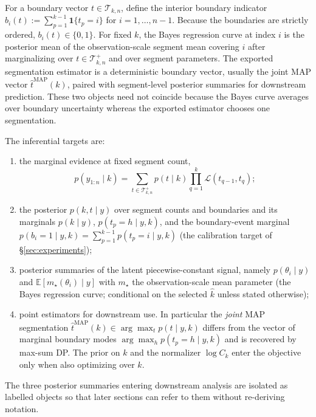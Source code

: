 \begin{definition}
\label{def:problem-bayes-curve}
For a boundary vector $t\in\mathcal{T}_{k,n}$, define the interior boundary indicator
$b_i(t):=\sum_{p=1}^{k-1}\mathbf{1}\{t_p=i\}$ for $i=1,\dots,n-1$. Because the boundaries are
strictly ordered, $b_i(t)\in\{0,1\}$. For fixed $k$, the Bayes regression curve at index $i$ is
the posterior mean of the observation-scale segment mean covering $i$ after marginalizing over
$t\in\mathcal{T}^{+}_{k,n}$ and over segment parameters. The exported segmentation estimator is a
deterministic boundary vector, usually the joint MAP vector $\widehat t^{\mathrm{MAP}}(k)$, paired
with segment-level posterior summaries for downstream prediction. These two objects need not
coincide because the Bayes curve averages over boundary uncertainty whereas the exported estimator
chooses one segmentation.
\end{definition}

The inferential targets are:
\begin{enumerate}[label=(\roman*), leftmargin=2.3em]
    \item the marginal evidence at fixed segment count,
    \[
      p(y_{1:n}\mid k)
      =\sum_{t\in\mathcal{T}^{+}_{k,n}}p(t\mid k)
        \prod_{q=1}^{k}\mathcal{L}(t_{q-1},t_q);
    \]
    \item the posterior $p(k,t\mid y)$ over segment counts and boundaries and its marginals
    $p(k\mid y)$, $p(t_p=h\mid y,k)$, and the boundary-event marginal
    \(p(b_i=1\mid y,k)=\sum_{p=1}^{k-1}p(t_p=i\mid y,k)\)
    (the calibration target of \S\ref{sec:experiments});
    \item posterior summaries of the latent piecewise-constant signal, namely
    $p(\theta_i\mid y)$ and $\mathbb{E}[m_\star(\theta_i)\mid y]$ with $m_\star$ the
    observation-scale mean parameter (the Bayes regression curve; conditional on the selected
    $\widehat k$ unless stated otherwise);
    \item point estimators for downstream use. In particular the \emph{joint} MAP segmentation
    \(\widehat t^{\mathrm{MAP}}(k)\in\arg\max_t p(t\mid y,k)\)
    differs from the vector of marginal boundary modes
    \(\arg\max_h p(t_p=h\mid y,k)\)
    and is recovered by max-sum DP. The prior on $k$ and the normalizer $\log C_k$ enter the
    objective only when also optimizing over $k$.
\end{enumerate}

The three posterior summaries entering downstream analysis are isolated as labelled objects so
that later sections can refer to them without re-deriving notation.


